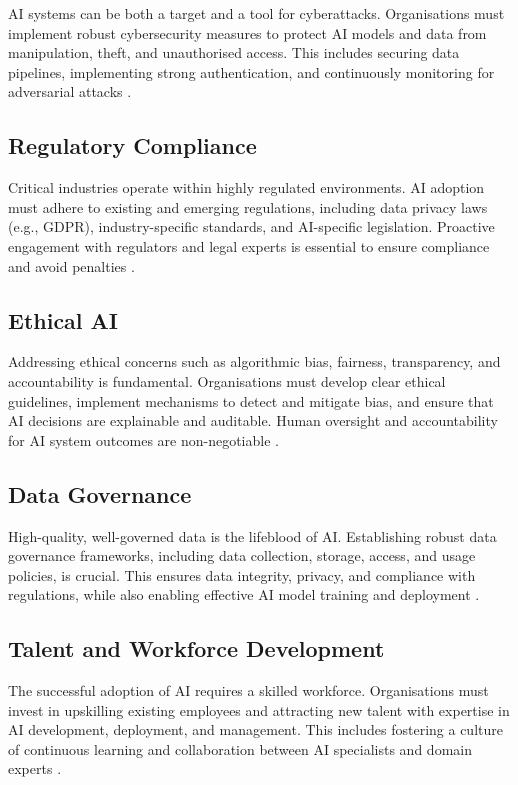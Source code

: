 AI systems can be both a target and a tool for cyberattacks. Organisations must implement robust cybersecurity measures to protect AI models and data from manipulation, theft, and unauthorised access. This includes securing data pipelines, implementing strong authentication, and continuously monitoring for adversarial attacks \parencite{cisc2025artificial}.

\subsection{Regulatory Compliance}

Critical industries operate within highly regulated environments. AI adoption must adhere to existing and emerging regulations, including data privacy laws (e.g., GDPR), industry-specific standards, and AI-specific legislation. Proactive engagement with regulators and legal experts is essential to ensure compliance and avoid penalties \parencite{dhs2024roles}.

\subsection{Ethical AI}

Addressing ethical concerns such as algorithmic bias, fairness, transparency, and accountability is fundamental. Organisations must develop clear ethical guidelines, implement mechanisms to detect and mitigate bias, and ensure that AI decisions are explainable and auditable. Human oversight and accountability for AI system outcomes are non-negotiable \parencite{leyliabadi2025conceptual}.

\subsection{Data Governance}

High-quality, well-governed data is the lifeblood of AI. Establishing robust data governance frameworks, including data collection, storage, access, and usage policies, is crucial. This ensures data integrity, privacy, and compliance with regulations, while also enabling effective AI model training and deployment \parencite{cisc2025artificial}.

\subsection{Talent and Workforce Development}

The successful adoption of AI requires a skilled workforce. Organisations must invest in upskilling existing employees and attracting new talent with expertise in AI development, deployment, and management. This includes fostering a culture of continuous learning and collaboration between AI specialists and domain experts \parencite{dhs2024roles}.

